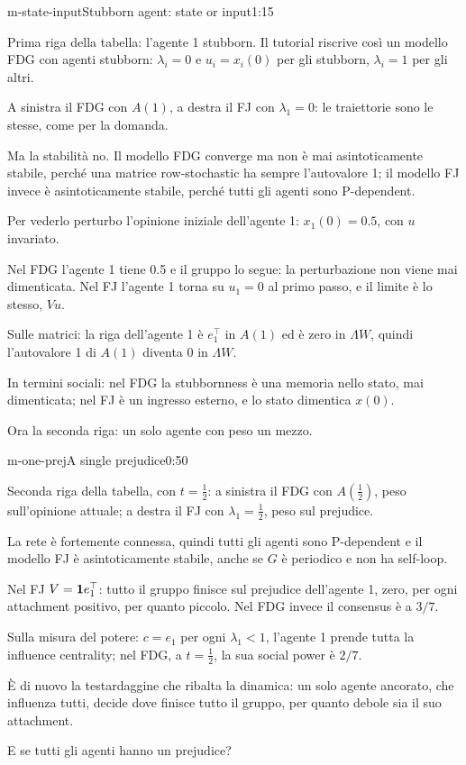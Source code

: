 \begin{slidedue}{m-state-input}{Stubborn agent: state or input}{1:15}
  \begin{discorso}
    \item Prima riga della tabella: l'agente 1 stubborn. Il tutorial riscrive così un modello FDG con agenti stubborn: $\lambda_i=0$ e $u_i=x_i(0)$ per gli stubborn, $\lambda_i=1$ per gli altri.
    \item A sinistra il FDG con $A(1)$, a destra il FJ con $\lambda_1=0$: le traiettorie sono le stesse, come per la domanda.
    \item Ma la stabilità no. Il modello FDG converge ma non è mai asintoticamente stabile, perché una matrice row-stochastic ha sempre l'autovalore 1; il modello FJ invece è asintoticamente stabile, perché tutti gli agenti sono P-dependent.
    \item \clic Per vederlo perturbo l'opinione iniziale dell'agente 1: $x_1(0)=0.5$, con $u$ invariato.
    \item Nel FDG l'agente 1 tiene 0.5 e il gruppo lo segue: la perturbazione non viene mai dimenticata. Nel FJ l'agente 1 torna su $u_1=0$ al primo passo, e il limite è lo stesso, $Vu$.
    \item Sulle matrici: la riga dell'agente 1 è $e_1^\top$ in $A(1)$ ed è zero in $\Lambda W$, quindi l'autovalore 1 di $A(1)$ diventa 0 in $\Lambda W$.
    \item In termini sociali: nel FDG la stubbornness è una memoria nello stato, mai dimenticata; nel FJ è un ingresso esterno, e lo stato dimentica $x(0)$.
    \item Ora la seconda riga: un solo agente con peso un mezzo.
  \end{discorso}
\end{slidedue}

\begin{slide}{m-one-prej}{A single prejudice}{0:50}
  \begin{discorso}
    \item Seconda riga della tabella, con $t=\tfrac12$: a sinistra il FDG con $A(\tfrac12)$, peso sull'opinione attuale; a destra il FJ con $\lambda_1=\tfrac12$, peso sul prejudice.
    \item La rete è fortemente connessa, quindi tutti gli agenti sono P-dependent e il modello FJ è asintoticamente stabile, anche se $G$ è periodico e non ha self-loop.
    \item Nel FJ $V=\mathbf{1} e_1^\top$: tutto il gruppo finisce sul prejudice dell'agente 1, zero, per ogni attachment positivo, per quanto piccolo. Nel FDG invece il consensus è a $3/7$.
    \item Sulla misura del potere: $c=e_1$ per ogni $\lambda_1<1$, l'agente 1 prende tutta la influence centrality; nel FDG, a $t=\tfrac12$, la sua social power è $2/7$.
    \item È di nuovo la testardaggine che ribalta la dinamica: un solo agente ancorato, che influenza tutti, decide dove finisce tutto il gruppo, per quanto debole sia il suo attachment.
    \item E se tutti gli agenti hanno un prejudice?
  \end{discorso}
\end{slide}

